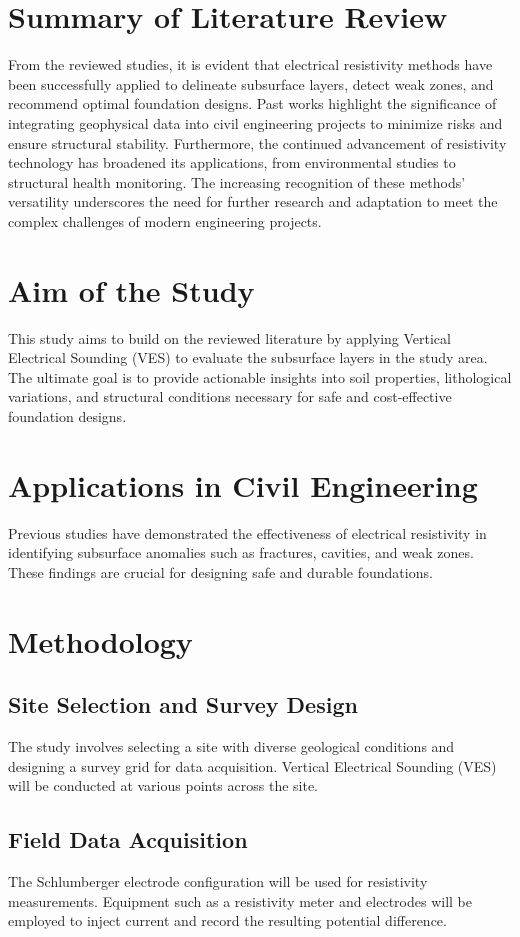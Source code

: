 \documentclass[12pt,a4paper]{report}
\begin{document}
\section{Summary of Literature Review}
From the reviewed studies, it is evident that electrical resistivity methods have been successfully applied to delineate subsurface layers, detect weak zones, and recommend optimal foundation designs. Past works highlight the significance of integrating geophysical data into civil engineering projects to minimize risks and ensure structural stability. Furthermore, the continued advancement of resistivity technology has broadened its applications, from environmental studies to structural health monitoring. The increasing recognition of these methods' versatility underscores the need for further research and adaptation to meet the complex challenges of modern engineering projects.


\section{Aim of the Study}
This study aims to build on the reviewed literature by applying Vertical Electrical Sounding (VES) to evaluate the subsurface layers in the study area. The ultimate goal is to provide actionable insights into soil properties, lithological variations, and structural conditions necessary for safe and cost-effective foundation designs.
\section{Applications in Civil Engineering}
Previous studies have demonstrated the effectiveness of electrical resistivity in identifying subsurface anomalies such as fractures, cavities, and weak zones. These findings are crucial for designing safe and durable foundations.

\section{Methodology}
\subsection{Site Selection and Survey Design}
The study involves selecting a site with diverse geological conditions and designing a survey grid for data acquisition. Vertical Electrical Sounding (VES) will be conducted at various points across the site.

\subsection{Field Data Acquisition}
The Schlumberger electrode configuration will be used for resistivity measurements. Equipment such as a resistivity meter and electrodes will be employed to inject current and record the resulting potential difference.
\end{document}
